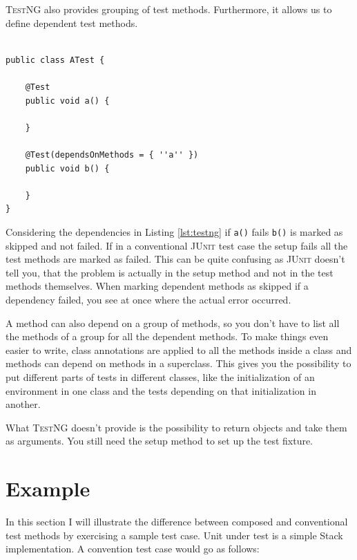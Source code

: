\documentclass[11pt]{article}
\newcommand{\JUnit}{\textsc{JUnit}\xspace}
\newcommand{\TestNG}{\textsc{TestNG}\xspace}
\newcommand{\ttt}[1]{\texttt{#1}}
\begin{document}
\TestNG also provides grouping of test methods. Furthermore, it allows us to define dependent test methods.

\begin{lstlisting}[label=lst:testng,caption=Dependent test methods with \TestNG.]

public class ATest {

	@Test
	public void a() {
		
	}
	
	@Test(dependsOnMethods = { ''a'' })
	public void b() {
	
	}
}

\end{lstlisting}

Considering the dependencies in Listing \ref{lst:testng} if \ttt{a()} fails \ttt{b()} is marked as skipped and not failed. If in a conventional \JUnit test case the setup fails all the test methods are marked as failed. This can be quite confusing as \JUnit doesn't tell you, that the problem is actually in the setup method and not in the test methods themselves. When marking dependent methods as skipped if a dependency failed, you see at once where the actual error occurred.

A method can also depend on a group of methods, so you don't have to list all the methods of a group for all the dependent methods. To make things even easier to write, class annotations are applied to all the methods inside a class and methods can depend on methods in a superclass. This gives you the possibility to put different parts of tests in different classes, like the initialization of an environment in one class and the tests depending on that initialization in another.

What \TestNG doesn't provide is the possibility to return objects and take them as arguments. You still need the setup method to set up the test fixture.

\section{Example}

\lstset{language=Java}

In this section I will illustrate the difference between composed and conventional test methods by exercising a sample test case. Unit under test is a simple Stack implementation. A convention test case would go as follows:
\end{document}
